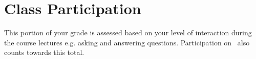 \section*{Class Participation}

This portion of your grade is assessed based on your level of interaction during the course lectures e.g. asking and answering questions. Participation on \slacklink~also counts towards this total.
